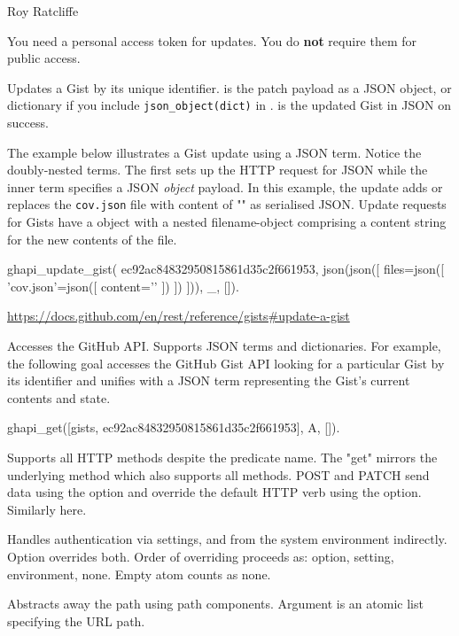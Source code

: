 \begin{tags}
Roy Ratcliffe
\end{tags}

You need a personal access token for updates. You do \textbf{not} require
them for public access.\vspace{0.7cm}

\begin{description}
Updates a Gist by its unique identifier.  is the patch payload
as a JSON object, or dictionary if you include \verb$json_object(dict)$ in
.  is the updated Gist in JSON on success.

The example below illustrates a Gist update using a JSON term.
Notice the doubly-nested  terms. The first sets up the HTTP
request for JSON while the inner term specifies a JSON \textit{object}
payload. In this example, the update adds or replaces the \verb$cov.json$
file with content of "\Scurl{}" as serialised JSON. Update requests for
Gists have a  object with a nested filename-object comprising
a content string for the new contents of the file.

\begin{code}
ghapi_update_gist(
    ec92ac84832950815861d35c2f661953,
    json(json([ files=json([ 'cov.json'=json([ content='{}'
                                             ])
                           ])
              ])), _, []).
\end{code}

\begin{tags}
\url{https://docs.github.com/en/rest/reference/gists#update-a-gist}
\end{tags}

Accesses the GitHub API. Supports JSON terms and dictionaries. For
example, the following goal accesses the GitHub Gist API looking for
a particular Gist by its identifier and unifies  with a JSON term
representing the Gist's current contents and state.

\begin{code}
ghapi_get([gists, ec92ac84832950815861d35c2f661953], A, []).
\end{code}

Supports all HTTP methods despite the predicate name. The "get"
mirrors the underlying  method which also supports all
methods. POST and PATCH send data using the  option and
override the default HTTP verb using the  option.
Similarly here.

Handles authentication via settings, and from the system environment
indirectly. Option  overrides both. Order of
overriding proceeds as: option, setting, environment, none. Empty
atom counts as none.

Abstracts away the path using path components. Argument
 is an atomic list specifying the URL path.
\end{description}

